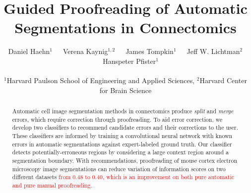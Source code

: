 \documentclass[10pt,twocolumn,letterpaper]{article}
\newcommand{\change}[1]{\textcolor{red}{#1}}
\newcommand\Mark[1]{\textsuperscript#1}
\begin{document}
\title{Guided Proofreading of Automatic Segmentations in Connectomics}
%

\author{Daniel Haehn$^1$~~~Verena Kaynig$^{1,2}$~~~James Tompkin$^1$~~~Jeff W. Lichtman$^2$~~~Hanspeter Pfister$^1$\\~\\
$^1$Harvard Paulson School of Engineering and Applied Sciences, $^2$Harvard Center for Brain Science
}

\maketitle

\begin{abstract}
Automatic cell image segmentation methods in connectomics produce \emph{split} and \emph{merge} errors, which require correction through proofreading. To aid error correction, we develop two classifiers to recommend candidate errors and their corrections to the user. These classifiers are informed by training a convolutional neural network with known errors in automatic segmentations against expert-labeled ground truth. Our classifier detects potentially-erroneous regions by considering a large context region around a segmentation boundary. With recommendations, proofreading of mouse cortex electron microscopy image segmentations can reduce variation of information scores on two different datasets \change{from 0.48 to 0.40, which is an improvement on both pure automatic and pure manual proofreading.}
\end{abstract}







{\small


}
\end{document}

